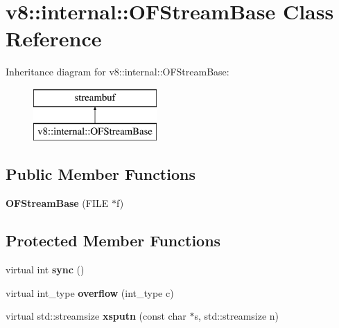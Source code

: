 \hypertarget{classv8_1_1internal_1_1_o_f_stream_base}{}\section{v8\+:\+:internal\+:\+:O\+F\+Stream\+Base Class Reference}
\label{classv8_1_1internal_1_1_o_f_stream_base}
Inheritance diagram for v8\+:\+:internal\+:\+:O\+F\+Stream\+Base\+:\begin{figure}[H]
\begin{center}
\leavevmode
\includegraphics[height=2.000000cm]{classv8_1_1internal_1_1_o_f_stream_base}
\end{center}
\end{figure}
\subsection*{Public Member Functions}
\begin{DoxyCompactItemize}
\item 
{\bfseries O\+F\+Stream\+Base} (F\+I\+LE $\ast$f)\hypertarget{classv8_1_1internal_1_1_o_f_stream_base_ac9d18e4ff834a53ad5e8ce5c43784f68}{}\label{classv8_1_1internal_1_1_o_f_stream_base_ac9d18e4ff834a53ad5e8ce5c43784f68}

\end{DoxyCompactItemize}
\subsection*{Protected Member Functions}
\begin{DoxyCompactItemize}
\item 
virtual int {\bfseries sync} ()\hypertarget{classv8_1_1internal_1_1_o_f_stream_base_a47675eb59fd35fd7da2690ddd2c37b2d}{}\label{classv8_1_1internal_1_1_o_f_stream_base_a47675eb59fd35fd7da2690ddd2c37b2d}

\item 
virtual int\+\_\+type {\bfseries overflow} (int\+\_\+type c)\hypertarget{classv8_1_1internal_1_1_o_f_stream_base_a8a7588a73e5504faf897292ec09996d4}{}\label{classv8_1_1internal_1_1_o_f_stream_base_a8a7588a73e5504faf897292ec09996d4}

\item 
virtual std\+::streamsize {\bfseries xsputn} (const char $\ast$s, std\+::streamsize n)\hypertarget{classv8_1_1internal_1_1_o_f_stream_base_a3a6ddbb3732a628f4856db0921ca4ca1}{}\label{classv8_1_1internal_1_1_o_f_stream_base_a3a6ddbb3732a628f4856db0921ca4ca1}

\end{DoxyCompactItemize}

